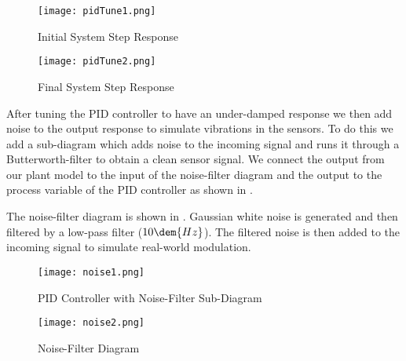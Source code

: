 \documentclass[main.tex]{subfile}
\begin{document}
\begin{figure}[h]
	\begin{center}
		\texttt{[image: pidTune1.png]}
	\end{center}
	\caption{Initial System Step Response}
	\label{fig:pidTune1}
\end{figure}

\begin{figure}[h]
	\begin{center}
		\texttt{[image: pidTune2.png]}
	\end{center}
	\caption{Final System Step Response}
	\label{fig:pidTune2}
\end{figure}

After tuning the PID controller to have an under-damped response we then add
noise to the output response to simulate vibrations in the sensors. To do this
we add a sub-diagram which adds noise to the incoming signal and runs it through
a Butterworth-filter to obtain a clean sensor signal. We connect the output from
our plant model to the input of the noise-filter diagram and the output to the
process variable of the PID controller as shown in .

The noise-filter diagram is shown in . Gaussian white noise is
generated and then filtered by a low-pass filter ($10\dem{Hz}$). The filtered
noise is then added to the incoming signal to simulate real-world modulation.

\begin{figure}[h]
	\begin{center}
		\texttt{[image: noise1.png]}
	\end{center}
	\caption{PID Controller with Noise-Filter Sub-Diagram}
	\label{fig:noise1}
\end{figure}

\begin{figure}[h]
	\begin{center}
		\texttt{[image: noise2.png]}
	\end{center}
	\caption{Noise-Filter Diagram}
	\label{fig:noise2}
\end{figure}

\end{document}
